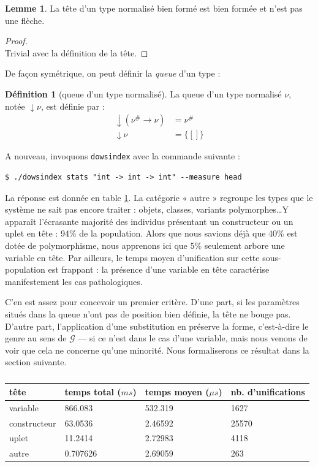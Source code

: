 \documentclass[a4paper]{report}
\newenvironment{preuve} 
  {\begin{proof}~\\} 
  {\end{proof}}
\theoremstyle{definition}
\newtheorem{definition}[theoreme]{Définition}
\newtheorem{lemme}[theoreme]{Lemme}
\newcommand{\dowsindex}{\texttt{dowsindex}\xspace}
\newcommand{\mset}[1]{\{\![#1]\!\}}
\newcommand{\G}{\mathscr{G}}
\begin{document}
\begin{lemme} \label{bf_implique_tete_bf_et_non_fleche}
  La tête d'un type normalisé bien formé est bien formée et n'est pas une flèche.
\end{lemme}

\begin{preuve}
  Trivial avec la définition de la tête.
\end{preuve}

De façon symétrique, on peut définir la \emph{queue} d'un type :

\begin{definition}[queue d'un type normalisé]
  La queue d'un type normalisé $\nu$, notée $\downarrow \nu$, est définie par :
  \begin{align*}
      \downarrow (\nu^\# \rightarrow \nu) &=
      \nu^\#
    \\
      \downarrow \nu &=
      \mset{}
  \end{align*}
\end{definition}

A nouveau, invoquons \dowsindex avec la commande suivante :

\begin{verbatim}
$ ./dowsindex stats "int -> int -> int" --measure head
\end{verbatim}

La réponse est donnée en table \ref{tab_meas2}. La catégorie « autre » regroupe les types que le système ne sait pas encore traiter : objets, classes, variants polymorphes\dots Y apparaît l'écrasante majorité des individus présentant un constructeur ou un uplet en tête : 94\% de la population. Alors que nous savions déjà que 40\% est dotée de polymorphisme, nous apprenons ici que 5\% seulement arbore une variable en tête. Par ailleurs, le temps moyen d'unification sur cette sous-population est frappant : la présence d'une variable en tête caractérise manifestement les cas pathologiques.

C'en est assez pour concevoir un premier critère. D'une part, si les paramètres situés dans la queue n'ont pas de position bien définie, la tête ne bouge pas. D'autre part, l'application d'une substitution en préserve la forme, c'est-à-dire le genre au sens de $\G$ — si ce n'est dans le cas d'une variable, mais nous venons de voir que cela ne concerne qu'une minorité. Nous formaliserons ce résultat dans la section suivante.

\begin{table}[h]
  \centering
  \begin{tabular}{|l|l|l|l|}
    \hline
      tête &
      temps total ($ms$) &
      temps moyen ($\mu s$) &
      nb. d'unifications
    \\
    \hline
      variable & 866.083 & 532.319 & 1627
    \\
      constructeur & 63.0536 & 2.46592 & 25570
    \\
      uplet & 11.2414 & 2.72983 & 4118
    \\
      autre & 0.707626 & 2.69059 & 263
    \\
    \hline
  \end{tabular}
  \caption{\label{tab_meas2}}
\end{table}
\end{document}
